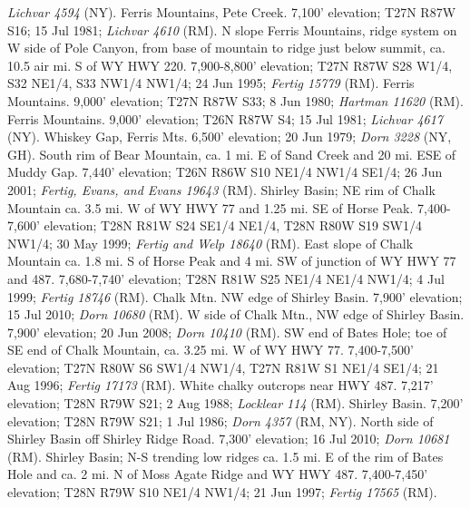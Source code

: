 \textit{Lichvar 4594} (NY).
Ferris Mountains, Pete Creek. 7,100' elevation; T27N R87W S16; 15 Jul 1981;
\textit{Lichvar 4610} (RM).
N slope Ferris Mountains, ridge system on W side of Pole Canyon, from base of
mountain to ridge just below summit, ca. 10.5 air mi. S of WY HWY 220.
7,900-8,800' elevation; T27N R87W S28 W1/4, S32 NE1/4, S33 NW1/4 NW1/4;
24 Jun 1995; \textit{Fertig 15779} (RM).
Ferris Mountains. 9,000' elevation; T27N R87W S33; 8 Jun 1980;
\textit{Hartman 11620} (RM).
Ferris Mountains. 9,000' elevation; T26N R87W S4; 15 Jul 1981;
\textit{Lichvar 4617} (NY).
Whiskey Gap, Ferris Mts. 6,500' elevation; 20 Jun 1979;
\textit{Dorn 3228} (NY, GH).
South rim of Bear Mountain, ca. 1 mi. E of Sand Creek and 20 mi. ESE of
Muddy Gap. 7,440' elevation; T26N R86W S10 NE1/4 NW1/4 SE1/4; 26 Jun 2001;
\textit{Fertig, Evans, and Evans 19643} (RM).
Shirley Basin; NE rim of Chalk Mountain ca. 3.5 mi. W of WY HWY 77 and 1.25
mi. SE of Horse Peak. 7,400-7,600' elevation; T28N R81W S24 SE1/4 NE1/4,
T28N R80W S19 SW1/4 NW1/4; 30 May 1999; \textit{Fertig and Welp 18640} (RM).
East slope of Chalk Mountain ca. 1.8 mi. S of Horse Peak and 4 mi. SW of
junction of WY HWY 77 and 487. 7,680-7,740' elevation; T28N R81W S25 NE1/4 NE1/4 NW1/4; 4 Jul 1999; \textit{Fertig 18746} (RM).
Chalk Mtn. NW edge of Shirley Basin. 7,900' elevation; 15 Jul 2010;
\textit{Dorn 10680} (RM).
W side of Chalk Mtn., NW edge of Shirley Basin. 7,900' elevation; 20 Jun 2008;
\textit{Dorn 10410} (RM).
SW end of Bates Hole; toe of SE end of Chalk Mountain, ca. 3.25 mi. W of WY
HWY 77. 7,400-7,500' elevation; T27N R80W S6 SW1/4 NW1/4,
T27N R81W S1 NE1/4 SE1/4; 21 Aug 1996; \textit{Fertig 17173} (RM).
White chalky outcrops near HWY 487. 7,217' elevation; T28N R79W S21;
2 Aug 1988; \textit{Locklear 114} (RM).
Shirley Basin. 7,200' elevation; T28N R79W S21; 1 Jul 1986;
\textit{Dorn 4357} (RM, NY).
North side of Shirley Basin off Shirley Ridge Road. 7,300' elevation;
16 Jul 2010; \textit{Dorn 10681} (RM).
Shirley Basin; N-S trending low ridges ca. 1.5 mi. E of the rim of Bates Hole
and ca. 2 mi. N of Moss Agate Ridge and WY HWY 487. 7,400-7,450' elevation;
T28N R79W S10 NE1/4 NW1/4; 21 Jun 1997; \textit{Fertig 17565} (RM).
